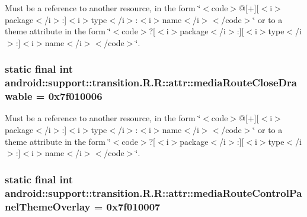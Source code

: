 Must be a reference to another resource, in the form \char`\"{}$<$code$>$@\mbox{[}+\mbox{]}\mbox{[}$<$i$>$package$<$/i$>$:\mbox{]}$<$i$>$type$<$/i$>$:$<$i$>$name$<$/i$>$$<$/code$>$\char`\"{} or to a theme attribute in the form \char`\"{}$<$code$>$?\mbox{[}$<$i$>$package$<$/i$>$:\mbox{]}\mbox{[}$<$i$>$type$<$/i$>$:\mbox{]}$<$i$>$name$<$/i$>$$<$/code$>$\char`\"{}. \hypertarget{classandroid_1_1support_1_1transition_1_1_r_1_1attr_a811a59fa217dfa813c980a894644f88}{
\subsubsection[{mediaRouteCloseDrawable}]{\setlength{\rightskip}{0pt plus 5cm}static final int android::support::transition.R.R::attr::mediaRouteCloseDrawable = 0x7f010006}}
\label{classandroid_1_1support_1_1transition_1_1_r_1_1attr_a811a59fa217dfa813c980a894644f88}


Must be a reference to another resource, in the form \char`\"{}$<$code$>$@\mbox{[}+\mbox{]}\mbox{[}$<$i$>$package$<$/i$>$:\mbox{]}$<$i$>$type$<$/i$>$:$<$i$>$name$<$/i$>$$<$/code$>$\char`\"{} or to a theme attribute in the form \char`\"{}$<$code$>$?\mbox{[}$<$i$>$package$<$/i$>$:\mbox{]}\mbox{[}$<$i$>$type$<$/i$>$:\mbox{]}$<$i$>$name$<$/i$>$$<$/code$>$\char`\"{}. \hypertarget{classandroid_1_1support_1_1transition_1_1_r_1_1attr_a0548efe8d46ac25b70ee60e55cb8f05}{
\subsubsection[{mediaRouteControlPanelThemeOverlay}]{\setlength{\rightskip}{0pt plus 5cm}static final int android::support::transition.R.R::attr::mediaRouteControlPanelThemeOverlay = 0x7f010007}}
\label{classandroid_1_1support_1_1transition_1_1_r_1_1attr_a0548efe8d46ac25b70ee60e55cb8f05}


